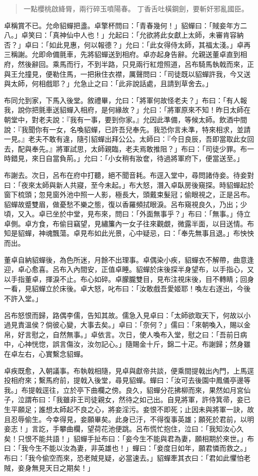 \begin{quote}
一點櫻桃啟絳脣，兩行碎玉噴陽春。
丁香舌吐橫鋼劍，要斬奸邪亂國臣。
\end{quote}

卓稱賞不已。允命貂蟬把盞。卓擎杯問曰：「青春幾何！」貂蟬曰：「賊妾年方二八。」卓笑曰：「真神仙中人也！」允起曰：「允欲將此女獻上太師，未審肯容納否？」卓曰：「如此見惠，何以報德？」允曰：「此女得侍太師，其福太淺。」卓再三稱謝。允即命備氈車，先將貂蟬送到相府。卓亦起身告辭。允親送董卓直到相府，然後辭回。乘馬而行，不到半路，只見兩行紅燈照道，呂布騎馬執戟而來，正與王允撞見，便勒住馬，一把揪住衣襟，厲聲問曰：「司徒既以貂蟬許我，今又送與太師，何相戲耶？」允急止之曰：「此非說話處，且請到草舍去。」

布同允到家，下馬入後堂。敘禮畢，允曰：「將軍何故怪老夫？」布曰：「有人報我，說你把氈車送貂蟬入相府，是何緣故？」允曰：「將軍原來不知！昨日太師在朝堂中，對老夫說：『我有一事，要到你家。』允因此準備，等候太師。飲酒中間說：『我聞你有一女，名喚貂蟬，已許吾兒奉先。我恐你言未準，特來相求，並請一見。』老夫不敢有違，隨引貂蟬出拜公公。太師曰：『今日良辰，吾即當取此女回去，配與奉先。』將軍試思，太師親臨，老夫焉敢推阻？」布曰：「司徒少罪。布一時錯見，來日自當負荊。」允曰：「小女稍有妝奩，待過將軍府下，便當送至。」

布謝去。次日，呂布在府中打聽，絕不聞音耗。布逕入堂中，尋問諸侍妾。待妾對曰：「夜來太師與新人共寢，至今未起。」布大怒，潛入卓臥房後窺探。時貂蟬起於窗下梳頭；忽見窗外池中照一人影，極長大，頭戴束髮冠；偷眼視之，正是呂布。貂蟬故蹙雙眉，做憂愁不樂之態，復以香羅頻拭眼淚。呂布窺視良久，乃出；少頃，又入。卓已坐於中堂，見布來，問曰：「外面無事乎？」布曰：「無事。」侍立卓側。卓方食，布偷目竊望，見繡簾內一女子往來觀覷，微露半面，以目送情。布知是貂蟬，神魂飄蕩。卓見布如此光景，心中疑忌，曰：「奉先無事且退。」布怏怏而出。

董卓自納貂蟬後，為色所迷，月餘不出理事。卓偶染小疾，貂蟬衣不解帶，曲意逢迎，卓心愈喜。呂布入內間安，正值卓睡。貂蟬於床後探半身望布，以手指心，又以手指董卓，揮淚不止。布心如碎。卓朦朧雙目，見布注視床後，目不轉睛；回身一看，見貂蟬立於床後。卓大怒，叱布曰：「汝敢戲吾愛姬耶！喚左右逐出，今後不許入堂。」

呂布怒恨而歸，路偶李儒，告知其故。儒急入見卓曰：「太師欲取天下，何故以小過見責溫侯？倘彼心變，大事去矣。」卓曰：「奈何？」儒曰：「來朝喚入，賜以金帛，好言慰之，自然無事。」卓依言。次日，使人喚布入堂，慰之曰：「吾前日病中，心神恍惚，誤言傷汝，汝勿記心。」隨賜金十斤，錦二十疋。布謝歸；然身雖在卓左右，心實繫念貂蟬。

卓疾既愈，入朝議事。布執戟相隨，見卓與獻帝共談，便乘間提戟出內門，上馬逕投相府來；繫馬府前，提戟入後堂，尋見貂蟬。蟬曰：「汝可去後園中鳳儀亭邊等我。」布提戟逕往，立於亭下曲欄之傍。良久，貂蟬分花拂柳而來，果然如月宮仙子，泣謂布曰：「我雖非王司徒親女，然待之如己出。自見將軍，許侍箕帚，妾已生平願足；誰想太師起不良之心，將妾淫污。妾恨不即死；止因未與將軍一訣，故且忍辱偷生。今幸得見，妾願畢矣。此身已汙，不得復事英雄；願死於君前，以明妾志！」言訖，手攀曲欄，望荷花池便跳。呂布慌忙抱住，泣曰：「我知汝心久矣！只恨不能共語！」貂蟬手扯布曰：「妾今生不能與君為妻，願相期於來世。」布曰：「我今生不能以汝為妻，非英雄也！」蟬曰：「妾度日如年，願君憐而救之。」布曰：「我今偷空而來，恐老賊見疑，必當速去。」貂蟬牽其衣曰：「君如此懼怕老賊，妾身無見天日之期矣！」

